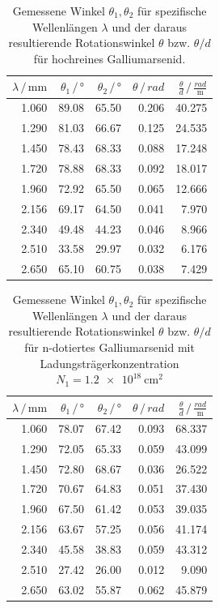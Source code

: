\begin{table}
    \centering
    \caption{Gemessene Winkel $\theta_1, \theta_2$ für spezifische Wellenlängen $\lambda$ und der daraus resultierende Rotationswinkel $\theta$ bzw. $\theta/d$ für hochreines Galliumarsenid.}
    \label{tab:rein}
    \begin{tabular}{r r r r r}
        \toprule
        $\lambda \,/\, \unit{\milli\metre}$ & $\theta_1 \,/\, \unit{\degree}$ & $\theta_2 \,/\, \unit{\degree}$ & $\theta \,/\, \unit{rad}$ & $\frac{\theta}{d} \,/\, \frac{rad}{\unit{\metre}}$ \\
        \midrule
        1.060 & 89.08 & 65.50 & 0.206 & 40.275 \\
        1.290 & 81.03 & 66.67 & 0.125 & 24.535 \\
        1.450 & 78.43 & 68.33 & 0.088 & 17.248 \\
        1.720 & 78.88 & 68.33 & 0.092 & 18.017 \\
        1.960 & 72.92 & 65.50 & 0.065 & 12.666 \\
        2.156 & 69.17 & 64.50 & 0.041 & 7.970 \\
        2.340 & 49.48 & 44.23 & 0.046 & 8.966 \\
        2.510 & 33.58 & 29.97 & 0.032 & 6.176 \\
        2.650 & 65.10 & 60.75 & 0.038 & 7.429 \\
        \bottomrule
    \end{tabular}
\end{table}

\begin{table}
    \centering
    \caption{Gemessene Winkel $\theta_1, \theta_2$ für spezifische Wellenlängen $\lambda$ und der daraus resultierende Rotationswinkel $\theta$ bzw. $\theta/d$ für n-dotiertes Galliumarsenid mit Ladungsträgerkonzentration $N_1 = \qty{1.2e18}{\centi\metre^2}$}
    \label{tab:N1}
    \begin{tabular}{r r r r r}
        \toprule
        $\lambda \,/\, \unit{\milli\metre}$ & $\theta_1 \,/\, \unit{\degree}$ & $\theta_2 \,/\, \unit{\degree}$ & $\theta \,/\, \unit{rad}$ & $\frac{\theta}{d} \,/\, \frac{rad}{\unit{\metre}}$ \\
        \midrule
        1.060 & 78.07 & 67.42 & 0.093 & 68.337 \\
        1.290 & 72.05 & 65.33 & 0.059 & 43.099 \\
        1.450 & 72.80 & 68.67 & 0.036 & 26.522 \\
        1.720 & 70.67 & 64.83 & 0.051 & 37.430 \\
        1.960 & 67.50 & 61.42 & 0.053 & 39.035 \\
        2.156 & 63.67 & 57.25 & 0.056 & 41.174 \\
        2.340 & 45.58 & 38.83 & 0.059 & 43.312 \\
        2.510 & 27.42 & 26.00 & 0.012 & 9.090 \\
        2.650 & 63.02 & 55.87 & 0.062 & 45.879 \\
        \bottomrule
    \end{tabular}
\end{table}


